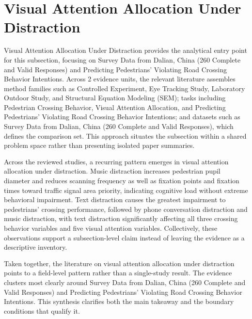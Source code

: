 \documentclass{article}
\begin{document}
\section{Visual Attention Allocation Under Distraction}
Visual Attention Allocation Under Distraction provides the analytical entry point for this subsection, focusing on Survey Data from Dalian, China (260 Complete and Valid Responses) and Predicting Pedestrians' Violating Road Crossing Behavior Intentions. Across 2 evidence units, the relevant literature assembles method families such as Controlled Experiment, Eye Tracking Study, Laboratory Outdoor Study, and Structural Equation Modeling (SEM); tasks including Pedestrian Crossing Behavior, Visual Attention Allocation, and Predicting Pedestrians' Violating Road Crossing Behavior Intentions; and datasets such as Survey Data from Dalian, China (260 Complete and Valid Responses), which defines the comparison set. This approach situates the subsection within a shared problem space rather than presenting isolated paper summaries. \cite{09_2018_jiang_aap,08_2016_zhou_aap}

Across the reviewed studies, a recurring pattern emerges in visual attention allocation under distraction. Music distraction increases pedestrian pupil diameter and reduces scanning frequency as well as fixation points and fixation times toward traffic signal area priority, indicating cognitive load without extreme behavioral impairment. Text distraction causes the greatest impairment to pedestrians' crossing performance, followed by phone conversation distraction and music distraction, with text distraction significantly affecting all three crossing behavior variables and five visual attention variables. Collectively, these observations support a subsection-level claim instead of leaving the evidence as a descriptive inventory. \cite{09_2018_jiang_aap,08_2016_zhou_aap}

Taken together, the literature on visual attention allocation under distraction points to a field-level pattern rather than a single-study result. The evidence clusters most clearly around Survey Data from Dalian, China (260 Complete and Valid Responses) and Predicting Pedestrians' Violating Road Crossing Behavior Intentions. This synthesis clarifies both the main takeaway and the boundary conditions that qualify it. \cite{09_2018_jiang_aap,08_2016_zhou_aap}
\end{document}
